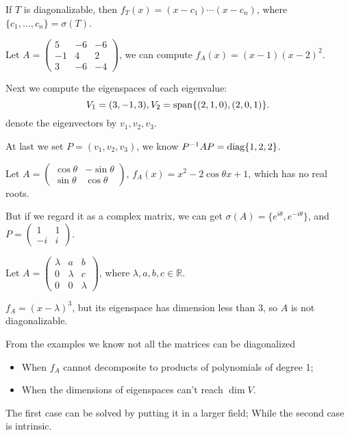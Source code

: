 If $T$ is diagonalizable, then  $f_T(x)=(x-c_1)\cdots (x-c_n)$, where
$\{c_1,\dots,c_n\}=\sigma(T)$.

\begin{example}
    Let $A = \begin{pmatrix}
		5&-6&-6\\-1&4&2\\3&-6&-4
    \end{pmatrix}$, we can compute $f_A(x)=(x-1)(x-2)^2$.

	Next we compute the eigenspaces of each eigenvalue:
	\[
	V_1=(3,-1,3), V_2=\operatorname{span}\{(2,1,0),(2,0,1)\}.
	\]
	denote the eigenvectors by $v_1,v_2,v_3$.

	At last we set $P=(v_1,v_2,v_3)$, we know $P^{-1}AP=\operatorname{diag}\{1,2,2\}$.
\end{example}
\begin{example}
    Let $A=\begin{pmatrix}
		\cos \theta &-\sin \theta \\ \sin\theta &\cos\theta
    \end{pmatrix}$, $f_A(x)=x^2-2\cos\theta x + 1$, which has no real roots.

	But if we regard it as a complex matrix, we can get
	$\sigma(A)=\{e^{i\theta}, e^{-i\theta}\}$,
	and $P = \begin{pmatrix}
		1&1\\-i&i
	\end{pmatrix}$.
\end{example}
\begin{example}
    Let $A=\begin{pmatrix}
		\lambda &a &b\\0&\lambda&c\\0&0&\lambda
    \end{pmatrix}$, where $\lambda,a,b,c\in \mathbb{R}$.

	$f_A=(x-\lambda)^3$, but its eigenspace has dimension less than $3$,
	so $A$ is not diagonalizable.
\end{example}

From the examples we know not all the matrices can be diagonalized
\begin{itemize}
	\item When $f_A$ cannot decomposite to products of polynomials of degree 1;
	\item When the dimensions of eigenspaces can't reach $\dim V$.
\end{itemize}
The first case can be solved by putting it in a larger field;
While the second case is intrinsic.

